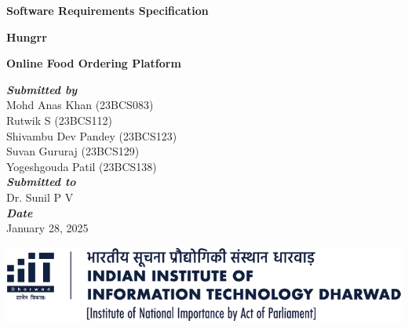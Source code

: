 \begin{titlepage}
  \begin{singlespace}
    \begin{center}

        \vspace*{\fill}
    
      \textbf{\Huge \fontfamily{\sfdefault}\selectfont Software Requirements Specification}

        \vspace*{\fill}

        \newpage
        \thispagestyle{empty}
      \textbf{\Huge \fontfamily{\sfdefault}\selectfont Hungrr}

      \textbf{\LARGE \fontfamily{\sfdefault}\selectfont Online Food Ordering Platform}

      \vfill

      {\Large
        \textbf{\textit{\fontfamily{\sfdefault}\selectfont Submitted by}}\\[0.5cm]
        \onehalfspacing
        Mohd Anas Khan (23BCS083) \\
        Rutwik S (23BCS112) \\
        Shivambu Dev Pandey (23BCS123) \\
        Suvan Gururaj (23BCS129) \\
        Yogeshgouda Patil (23BCS138) \\[1.2cm]

        \textbf{\textit{\fontfamily{\sfdefault}\selectfont Submitted to}}\\[0.5cm]
        Dr. Sunil P V \\[1.2cm]

        \textbf{\textit{\fontfamily{\sfdefault}\selectfont Date}}\\[0.5cm]
        January 28, 2025
      }

      \vfill
      \includegraphics[width=0.8\linewidth]{./images/logo-full-light.png}

    \end{center}
  \end{singlespace}
  \restoregeometry
\end{titlepage}